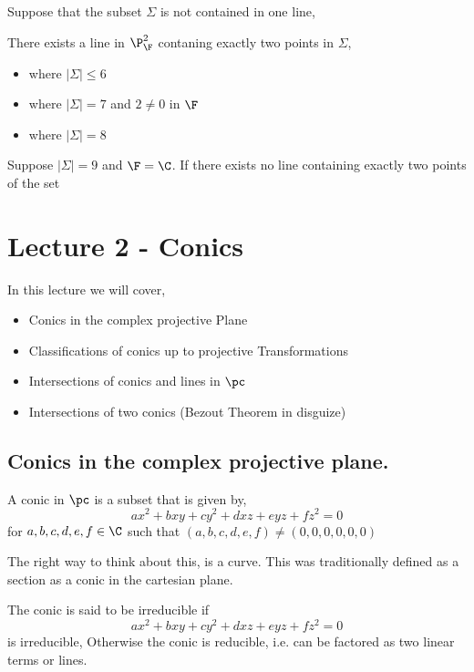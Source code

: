 \documentclass{article}
\begin{document}
Suppose that the subset $\Sigma$ is not contained in one line,

\begin{nlemma}[]
  There exists a line in $\P_\F^2$ contaning exactly two points in $\Sigma$,
  \begin{itemize}
    \item where $|\Sigma| \le 6$
    \item where $|\Sigma| = 7$ and $2 \ne 0$ in $\F$
    \item where $|\Sigma| = 8$
  \end{itemize}
\end{nlemma}

\begin{nthm}[]
  Suppose $|\Sigma| = 9$ and $\F=\C$. If there exists no line containing exactly two points of the set
\end{nthm}

\section{Lecture 2 - Conics}
In this lecture we will cover,
\begin{itemize}
  \item Conics in the complex projective Plane
  \item Classifications of conics up to projective Transformations
  \item Intersections of conics and lines in $\pc$
  \item Intersections of two conics (Bezout Theorem in disguize)
\end{itemize}

\subsection{Conics in the complex projective plane.}

\begin{ndefi}[Conic]
  A conic in $\pc$ is a subset that is given by,
  $$ ax^2 + bxy + cy^2 + dxz + eyz + fz^2 = 0 $$
  for $a, b, c, d, e, f \in \C$ such that $(a, b, c, d, e, f) \ne (0, 0, 0,0,0,0)$
\end{ndefi}

The right way to think about this, is a curve. This was traditionally defined as a section as a conic in the cartesian plane.

\begin{ndefi}[Irriducible]
  The conic is said to be irreducible if
  $$ ax^2 + bxy + cy^2 + dxz + eyz + fz^2 = 0 $$
  is irreducible, Otherwise the conic is reducible, i.e. can be factored as two linear terms or lines.
\end{ndefi}
\end{document}
